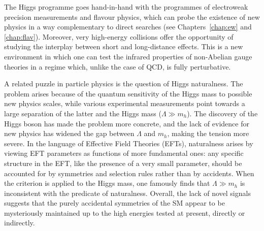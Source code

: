 \documentclass[../report.tex]{subfiles}
\begin{document}
 The Higgs programme goes hand-in-hand with the programmes of electroweak precision measurements and flavour physics, which can probe the existence of new physics in a way complementary to direct searches (see Chapters~\ref{chap:ew} and \ref{chap:flav}). Moreover, very high-energy collisions offer the opportunity of studying the interplay between short and long-distance effects. 
 This is a new environment in which one can test the infrared properties of non-Abelian gauge theories in a regime which, unlike the case of QCD, is fully perturbative.   


\medskip
{}

\smallskip
\noindent
A related puzzle in particle physics is the question of Higgs naturalness. 
 The problem arises because of the quantum sensitivity of the Higgs mass to possible new physics scales, while  various experimental measurements point
 towards a large separation of the latter and the Higgs mass ($\Lambda \gg m_h$).  The discovery of the Higgs boson has made the problem more concrete, and the lack of evidence for new physics has widened the gap between $\Lambda$ and $m_h$, making the tension more severe.
 In the language of  Effective Field Theories (EFTs), naturalness arises by viewing EFT parameters as functions of more fundamental ones: any specific structure in the EFT, like the presence of a very small parameter, should be accounted for by symmetries and selection rules rather than by accidents. When the criterion is applied to the Higgs mass, one famously finds that $\Lambda \gg m_h$ is inconsistent with the predicate of naturalness.  Overall, the lack of novel signals suggests that the purely accidental symmetries of the SM appear to be mysteriously maintained up to the high energies tested at present, directly or indirectly. 
\end{document}
